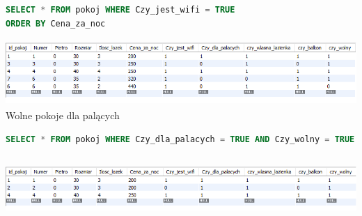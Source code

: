 \documentclass[12pt,a4paper]{article}
\begin{document}
\begin{lstlisting}[language=SQL]
SELECT * FROM pokoj WHERE Czy_jest_wifi = TRUE
ORDER BY Cena_za_noc
\end{lstlisting}
\includegraphics[angle=0,width=150mm,height=25mm]{img/result2.png}
Wolne pokoje dla palących

\begin{lstlisting}[language=SQL]
SELECT * FROM pokoj WHERE Czy_dla_palacych = TRUE AND Czy_wolny = TRUE
\end{lstlisting}
\includegraphics[angle=0,width=150mm,height=25mm]{img/result1.png}

\noindent


\nocite{*}
\end{document}
